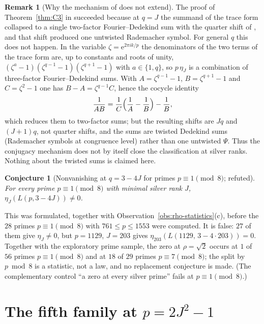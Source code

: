 \documentclass[11pt]{article}
\newtheorem{conjecture}[theorem]{Conjecture}
\theoremstyle{definition}
\newtheorem{remark}[theorem]{Remark}
\newcommand{\e}{\mathrm e}
\begin{document}
\begin{remark}[Why the mechanism of {\cite[Sec.~7]{LensChirality2026}} does not extend]
\label{rem:kill}
The proof of Theorem~\ref{thm:C3} in \cite[Sec.~7]{LensChirality2026} succeeded because at $q=J$ the summand
of the trace form \cite[eq.~(19)]{LensChirality2026} collapsed \cite[Lems.~7.2--7.3]{LensChirality2026} to a single
two-factor Fourier--Dedekind sum with the quarter shift of
\cite[Lem.~7.4]{LensChirality2026}, and that shift produced one untwisted
Rademacher symbol.  For general $q$ this does not happen.  In the
variable $\zeta=\e^{2\pi ik/p}$ the denominators of the two terms of
the trace form are, up to constants and roots of unity,
$(\zeta^{a}-1)(\zeta^{q-1}-1)(\zeta^{q+1}-1)$ with $a\in\{1,q\}$, so
$p\,\eta_J$ is a combination of three-factor Fourier--Dedekind sums.
With $A=\zeta^{q-1}-1$, $B=\zeta^{q+1}-1$ and $C=\zeta^2-1$ one has
$B-A=\zeta^{q-1}C$, hence the cocycle identity
\[
 \frac1{AB}=\frac1C\Bigl(\frac1A-\frac1B\Bigr)-\frac1B ,
\]
which reduces them to two-factor sums; but the resulting shifts are $Jq$
and $(J+1)q$, not quarter shifts, and the sums are twisted Dedekind sums
(Rademacher symbols at congruence level) rather than one untwisted
$\Psi$.  Thus the conjugacy mechanism does not by itself close the
classification at silver ranks.  Nothing about the twisted sums is
claimed here.
\end{remark}

\begin{conjecture}[Nonvanishing at $q=3-4J$ for primes $p\equiv1\pmod8$; refuted]
\label{conj:C5}
For every prime $p\equiv1\pmod8$ with minimal silver rank $J$,
$\eta_J(L(p,3-4J))\neq0$.
\end{conjecture}

This was formulated, together with Observation~\ref{obs:rho-statistics}(c),
before the $28$ primes $p\equiv1\pmod8$ with $761\leq p\leq1553$ were
computed.  It is false: $27$ of them give $\eta_J\neq0$, but $p=1129$,
$J=203$ gives $\eta_{203}(L(1129,\,3-4\cdot203))=0$.  Together with the
exploratory prime sample, the zero at $\rho=\sqrt2$ occurs at $1$ of $56$ primes
$p\equiv1\pmod8$ and at $18$ of $29$ primes $p\equiv7\pmod8$; the split
by $p\bmod8$ is a statistic, not a law, and no replacement conjecture is
made.  (The complementary control ``a zero at every silver prime'' fails
at $p\equiv1\pmod8$.)

\section{The fifth family at \texorpdfstring{$p=2J^2-1$}{p = 2J\textasciicircum 2 - 1}}
\label{sec:fifth}
\end{document}
